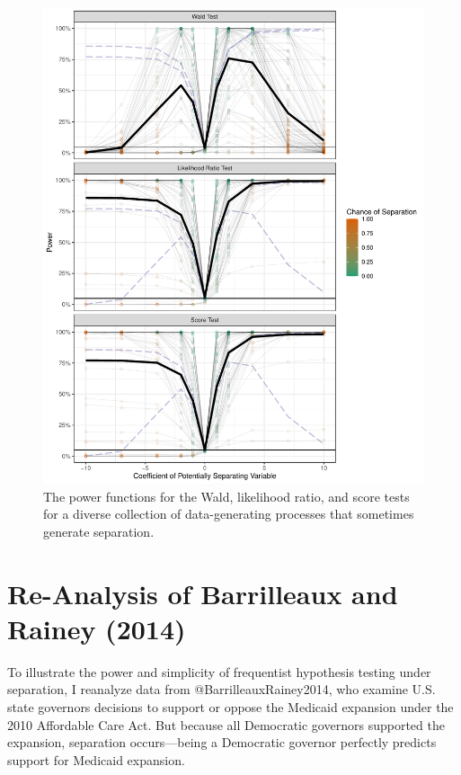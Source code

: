 \documentclass[
]{article}
\begin{document}
\begin{figure}[!h]
\includegraphics[scale = 0.7]{doc/fig/power-funs.pdf}
\caption{The power functions for the Wald, likelihood ratio, and score tests for a diverse collection of data-generating processes that sometimes generate separation.}\label{fig:power-funs}
\end{figure}

\hypertarget{re-analysis-of-barrilleaux-and-rainey-2014}{%
\section{Re-Analysis of Barrilleaux and Rainey
(2014)}\label{re-analysis-of-barrilleaux-and-rainey-2014}}

To illustrate the power and simplicity of frequentist hypothesis testing
under separation, I reanalyze data from @BarrilleauxRainey2014, who
examine U.S. state governors decisions to support or oppose the Medicaid
expansion under the 2010 Affordable Care Act. But because all Democratic
governors supported the expansion, separation occurs---being a
Democratic governor perfectly predicts support for Medicaid expansion.
\end{document}
